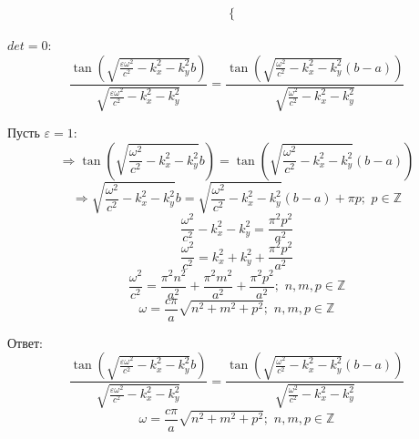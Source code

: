 \documentclass[12pt]{article}
\begin{document}
\begin{large}
\begin{eqnarray*}
\begin{cases}
    \end{cases}
\end{eqnarray*}
\par $det = 0$:
\[
    \frac{\tan\left( \sqrt{\frac{\varepsilon \omega^2}{c^2} - k_x^2 - k_y^2} b\right)}{ \sqrt{\frac{\varepsilon \omega^2}{c^2} - k_x^2 - k_y^2}} = \frac{\tan\left( \sqrt{\frac{ \omega^2}{c^2} - k_x^2 - k_y^2} \left(b-a\right)\right)}{ \sqrt{\frac{ \omega^2}{c^2} - k_x^2 - k_y^2}}
\]
\par Пусть $\varepsilon = 1$:
\[
    \Rightarrow \tan\left( \sqrt{\frac{\omega^2}{c^2} - k_x^2 - k_y^2} b\right) = \tan\left( \sqrt{\frac{ \omega^2}{c^2} - k_x^2 - k_y^2} \left(b-a\right)\right)
\]
\[
    \Rightarrow \sqrt{\frac{\omega^2}{c^2} - k_x^2 - k_y^2} b  = \sqrt{\frac{ \omega^2}{c^2} - k_x^2 - k_y^2} \left(b-a\right) + \pi p ; \,\, p \in \mathbb{Z}
\]
\[
    \frac{\omega^2}{c^2} - k_x^2 - k_y^2 = \frac{\pi^2p^2}{a^2}
\]
\[
    \frac{\omega^2}{c^2} = k_x^2 + k_y^2 + \frac{\pi^2p^2}{a^2}
\]
\[
    \frac{\omega^2}{c^2} = \frac{\pi^2n^2}{a^2} + \frac{\pi^2m^2}{a^2} + \frac{\pi^2p^2}{a^2} ; \,\, n, m, p \in \mathbb{Z}
\]
\[
    \omega = \frac{c \pi}{a}\sqrt{n^2 + m^2+ p^2} ; \,\, n, m, p \in \mathbb{Z}
\]
\par Ответ:
\[
    \frac{\tan\left( \sqrt{\frac{\varepsilon \omega^2}{c^2} - k_x^2 - k_y^2} b\right)}{ \sqrt{\frac{\varepsilon \omega^2}{c^2} - k_x^2 - k_y^2}} = \frac{\tan\left( \sqrt{\frac{ \omega^2}{c^2} - k_x^2 - k_y^2} \left(b-a\right)\right)}{ \sqrt{\frac{ \omega^2}{c^2} - k_x^2 - k_y^2}}
\]
\[
    \omega = \frac{c \pi}{a}\sqrt{n^2 + m^2+ p^2} ; \,\, n, m, p \in \mathbb{Z}
\]
\par
\par
\end{large}
\end{document}
